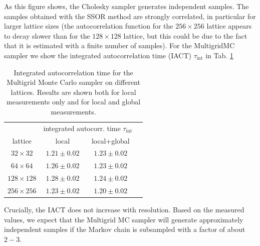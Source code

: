 \documentclass[11pt]{article}
\begin{document}
As this figure shows, the Cholesky sampler generates independent samples. The samples obtained with the SSOR method are strongly correlated, in particular for larger lattice sizes (the autocorrelation function for the $256\times 256$ lattice appears to decay slower than for the $128\times 128$ lattice, but this could be due to the fact that it is estimated with a finite number of samples). For the MultigridMC sampler we show the integrated autocorrelation time (IACT) $\tau_{\text{int}}$ in Tab. \ref{tab:tau_int}
\begin{table}
    \begin{center}
        \begin{tabular}{cccc}
            \hline
                     & \multicolumn{2}{c}{integrated autocorr. time $\tau_{\text{int}}$} \\
                     lattice& local & local+global\\
            \hline\hline
            $32 \times 32$  & $1.21 \pm  0.02$ & $1.23 \pm  0.02$   \\
            $64\times 64$   & $1.26 \pm 0.02$ & $1.23 \pm  0.02$    \\
            $128\times 128$ & $1.28 \pm  0.02$ &  $1.24 \pm  0.02$  \\
            $256\times256$  & $1.23 \pm  0.02$ & $1.20 \pm  0.02$   \\
            \hline
        \end{tabular}
        \caption{Integrated autocorrelation time for the Multigrid Monte Carlo sampler on different lattices. Results are shown both for local measurements only and for local and global measurements.}
        \label{tab:tau_int}
    \end{center}
\end{table}
Crucially, the IACT does not increase with resolution. Based on the measured values, we expect that the Multigrid MC sampler will generate approximately independent samples if the Markov chain is subsampled with a factor of about $2-3$.
\end{document}
